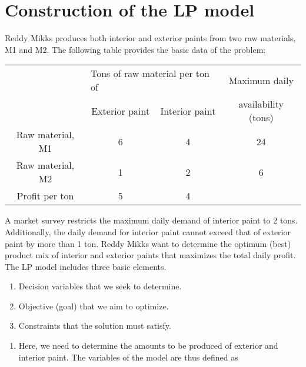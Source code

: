 \documentclass[../main-sheet.tex]{subfiles}
\begin{document}
\section{Construction of the LP model}
\begin{ex}
    Reddy Mikks produces both interior and exterior paints from two raw materials, M1 and M2. The following table provides the basic data of the problem:
    \begin{table}[H]
        \centering
        \begin{tabular}{cccc}
            \toprule
                             & \multicolumn{2}{l}{Tons of raw material per ton of} & Maximum daily                        \\ \cmidrule(lr){2-3}
                             & Exterior paint                                      & Interior paint & availability (tons) \\ \midrule
            Raw material, M1 & 6                                                   & 4              & 24                  \\
            Raw material, M2 & 1                                                   & 2              & 6                   \\ \midrule
            Profit per ton   & 5                                                   & 4              &                     \\ \bottomrule
        \end{tabular}
    \end{table}
    A market survey restricts the maximum daily demand of interior paint to 2 tons. Additionally, the daily demand for interior paint cannot exceed that of exterior paint by more than 1 ton. Reddy Mikks want to determine the optimum (best) product mix of interior and exterior paints that maximizes the total daily profit.\\

    The LP model includes three basic elements.
    \begin{enumerate}
        \item Decision variables that we seek to determine.
        \item Objective (goal) that we aim to optimize.
        \item Constraints that the solution must satisfy.
    \end{enumerate}


    \begin{enumerate}[label=Step \arabic*:]
        \item Here, we need to determine the amounts to be produced of exterior and
              interior paint. The variables of the model are thus defined as


\end{enumerate}
\end{ex}
\end{document}
